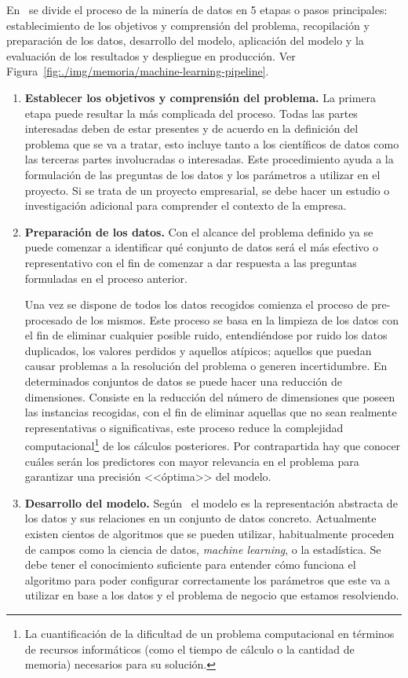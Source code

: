 En~\cite{KOTU201517} se divide el proceso de la minería de datos en 5 etapas o pasos principales: establecimiento de los objetivos y comprensión del problema, recopilación y preparación de los datos, desarrollo del modelo, aplicación del modelo y la evaluación de los resultados y despliegue en producción. Ver Figura~\ref{fig:./img/memoria/machine-learning-pipeline}.


\begin{enumerate}
   \item \textbf{Establecer los objetivos y comprensión del problema.}
    La primera etapa puede resultar la más complicada del proceso. Todas las partes interesadas deben de estar presentes y de acuerdo en la definición del problema que se va a tratar, esto incluye tanto a los científicos de datos como las terceras partes involucradas o interesadas. 
    Este procedimiento ayuda a la formulación de las preguntas de los datos y los parámetros a utilizar en el proyecto. Si se trata de un proyecto empresarial, se debe hacer un estudio o investigación adicional para comprender el contexto de la empresa.
    \item \textbf{Preparación de los datos.}
    Con el alcance del problema definido ya se puede comenzar a identificar qué conjunto de datos será el más efectivo o representativo con el fin de comenzar a dar respuesta a las preguntas formuladas en el proceso anterior.
    
    Una vez se dispone de todos los datos recogidos comienza el proceso de pre-procesado de los mismos. Este proceso se basa en la limpieza de los datos con el fin de eliminar cualquier posible ruido, entendiéndose por ruido los datos duplicados, los valores perdidos y aquellos atípicos; aquellos que puedan causar problemas a la resolución del problema o generen incertidumbre.
    En determinados conjuntos de datos se puede hacer una reducción de dimensiones. Consiste en la reducción del número de dimensiones que poseen las instancias recogidas, con el fin de eliminar aquellas que no sean realmente representativas o significativas, este proceso reduce la complejidad computacional\footnote{La cuantificación de la dificultad de un problema computacional en términos de recursos informáticos (como el tiempo de cálculo o la cantidad de memoria) necesarios para su solución.} de los cálculos posteriores. Por contrapartida hay que conocer cuáles serán los predictores con mayor relevancia en el problema para garantizar una precisión <<óptima>> del modelo.
    \item \textbf{Desarrollo del modelo.}
    Según~\cite{KOTU201517} el modelo es la representación abstracta de los datos y sus relaciones en un conjunto de datos concreto. Actualmente existen cientos de algoritmos que se pueden utilizar, habitualmente proceden de campos como la ciencia de datos, \textit{machine learning}, o la estadística.
    Se debe tener el conocimiento suficiente para entender cómo funciona el algoritmo para poder configurar correctamente los parámetros que este va a utilizar en base a los datos y el problema de negocio que estamos resolviendo. 
    

\end{enumerate}
